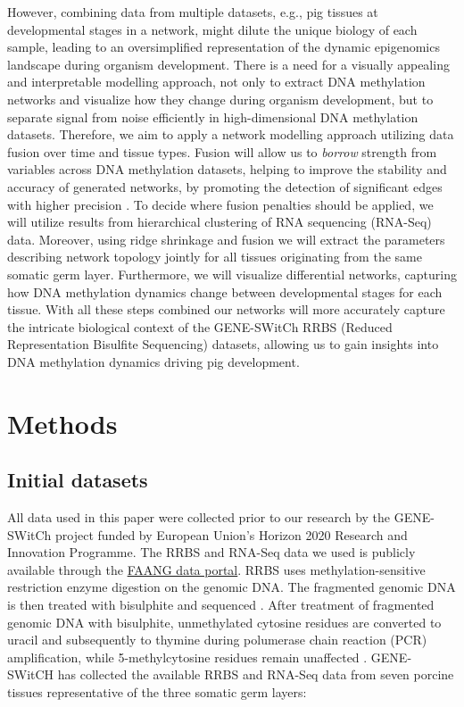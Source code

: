 \documentclass[
	a4paper, %
	10pt, %
	unnumberedsections, %
	twoside, %
]{LTJournalArticle}
\begin{document}
However, combining data from multiple datasets, e.g., pig tissues at developmental 
stages in a network, might 
dilute the unique biology of each sample, leading to an oversimplified representation 
of the dynamic epigenomics landscape 
during organism development. There is a need for a visually appealing and 
interpretable modelling approach, not only to 
extract DNA methylation networks and visualize how they change during organism development, 
but to separate signal from 
noise efficiently in high-dimensional DNA methylation datasets. Therefore, we aim to 
apply a network modelling approach 
utilizing data fusion over time and tissue types. Fusion will allow us to \textit{borrow} 
strength from variables across DNA 
methylation datasets, helping to improve the stability and accuracy of 
generated networks, by promoting the detection of significant 
edges with higher precision \autocite{price-a}. To decide where fusion penalties 
should be applied, we will utilize results from hierarchical 
clustering of RNA sequencing (RNA-Seq) data. Moreover, using ridge shrinkage and 
fusion we will extract the parameters describing network topology 
jointly for all tissues originating from the same somatic germ layer. Furthermore, 
we will visualize differential networks, 
capturing how DNA methylation dynamics change between developmental stages for 
each tissue. With all these steps combined our 
networks will more accurately capture the intricate biological context of the 
GENE-SWitCh RRBS (Reduced Representation Bisulfite 
Sequencing) datasets, allowing us to gain insights into DNA methylation dynamics 
driving pig development.


\section{\large Methods}
\subsection{\normalsize Initial datasets}
All data used in this paper were collected prior to our research by the GENE-SWitCh 
project funded by  European Union's Horizon 2020 Research 
and Innovation Programme. The RRBS and RNA-Seq data we used is publicly available 
through the \href{https://data.faang.org/projects/GENE-SWitCH}{FAANG data portal}.
RRBS uses methylation-sensitive restriction enzyme digestion on the genomic DNA. 
The fragmented genomic DNA is then treated with bisulphite and sequenced 
\autocite{kalavacharla2017a}. After treatment of 
fragmented genomic DNA with bisulphite, unmethylated cytosine residues are 
converted to uracil and subsequently to thymine during polumerase chain 
reaction (PCR) amplification, 
while 5-methylcytosine residues remain unaffected \autocite{miyata2017a, li2011a}.
GENE-SWitCH has collected the available RRBS and RNA-Seq data from seven porcine 
tissues representative of the three somatic germ layers:
\end{document}
